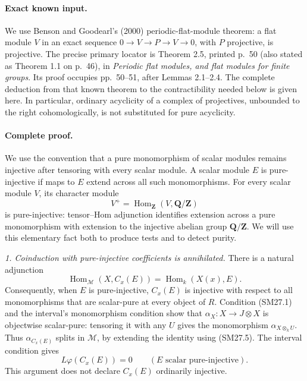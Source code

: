 \documentclass[11pt,a4paper]{article}
\theoremstyle{definition}\newtheorem{definition}[theorem]{Definition}
\theoremstyle{remark}\newtheorem{remark}[theorem]{Remark}
\begin{document}
\paragraph{Exact known input.}
We use Benson and Goodearl's (2000) periodic-flat-module theorem:
a flat module \(V\) in an exact sequence
\(0\to V\to P\to V\to0\), with \(P\) projective, is projective.
The precise primary locator is Theorem 2.5, printed p.~50
(also stated as Theorem 1.1 on p.~46), in
\emph{Periodic flat modules, and flat modules for finite groups}.
Its proof occupies pp.~50--51, after Lemmas 2.1--2.4.
The complete deduction from that known theorem to the contractibility
needed below is given here.  In particular, ordinary acyclicity of a
complex of projectives, unbounded to the right cohomologically, is
not substituted for pure acyclicity.

\paragraph{Complete proof.}
We use the convention that a pure monomorphism of scalar modules
remains injective after tensoring with every scalar module.
A scalar module \(E\) is pure-injective if maps to \(E\) extend across
all such monomorphisms.  For every scalar module \(V\), its character
module
\[
 V^+=\operatorname{Hom}_{\mathbf Z}(V,\mathbf Q/\mathbf Z)
\]
is pure-injective: tensor--Hom adjunction identifies extension across
a pure monomorphism with extension to the injective abelian group
\(\mathbf Q/\mathbf Z\).  We will use this elementary fact both to
produce tests and to detect purity.

\emph{1. Coinduction with pure-injective coefficients is annihilated.}
There is a natural adjunction
\[
 \operatorname{Hom}_{\mathcal M}(X,C_x(E))
   =\operatorname{Hom}_k(X(x),E).
 \tag{SM27.5}
\]
Consequently, when \(E\) is pure-injective, \(C_x(E)\) is injective
with respect to all monomorphisms that are scalar-pure at every
object of \(R\).  Condition (SM27.1) and the interval's monomorphism
condition show that \(\alpha_X:X\to J\otimes X\) is objectwise
scalar-pure: tensoring it with any \(U\) gives the monomorphism
\(\alpha_{X\otimes_k U}\).  Thus \(\alpha_{C_x(E)}\) splits in
\(\mathcal M\), by extending the identity using (SM27.5).
The interval condition gives
\[
 L\varphi(C_x(E))=0\qquad(E\text{ scalar pure-injective}).
 \tag{SM27.6}
\]
This argument does not declare \(C_x(E)\) ordinarily injective.
\end{document}
